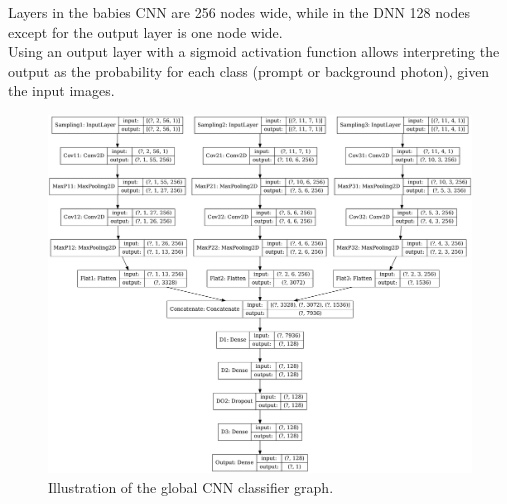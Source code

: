 Layers in the babies CNN are 256 nodes wide, while in the DNN 128 nodes except for the output layer is one node wide.\\
Using an output layer with a sigmoid activation function allows interpreting the output as the probability for each class (prompt or background photon), given the input images.\\
\begin{figure}[htbp]
    \centering
    \includegraphics[width=1.\textwidth]{Ch3/Img/CNN_model.png}
    \begin{tcolorbox}[colback=black!5!white,colframe=white!75!black]
    \caption{Illustration of the global CNN classifier graph.}
    \label{fig:gamma:CNN:Model:Arch}
    \end{tcolorbox}
    
\end{figure}
